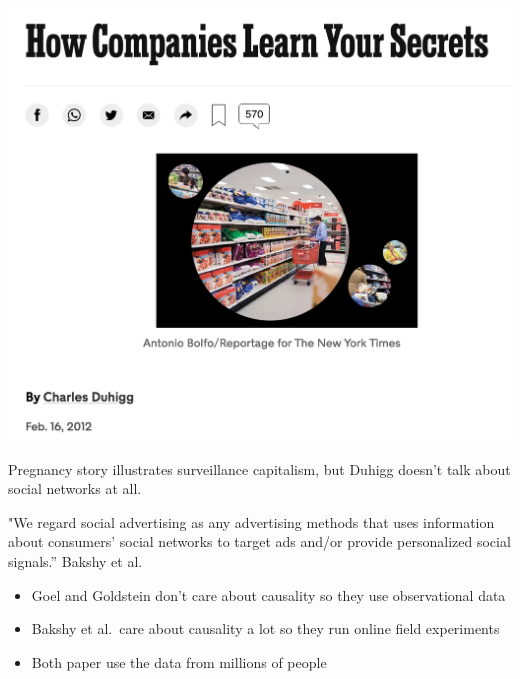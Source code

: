 \documentclass[aspectratio=169]{beamer}
\begin{document}
\begin{frame}

\begin{center}
\includegraphics[height=0.8\textheight]{figures/duhigg_how_2012_top}
\end{center}

Pregnancy story illustrates surveillance capitalism, but Duhigg doesn't talk about social networks at all. 

\end{frame}
\begin{frame}

"We regard social advertising as any advertising methods that uses information about consumers' social networks to target ads and/or provide personalized social signals.'' Bakshy et al.\

\begin{itemize}
\item Goel and Goldstein don't care about causality so they use observational data 
\item Bakshy et al.\ care about causality a lot so they run online field experiments
\item Both paper use the data from millions of people
\end{itemize}

\end{frame}
\end{document}
